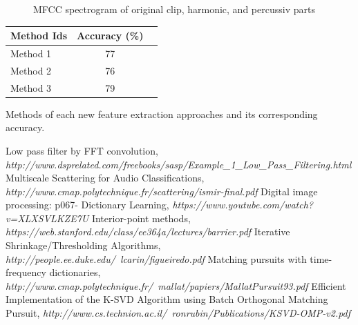 \documentclass[final]{siamltexmm}
\begin{document}
\begin{figure}[!ht]
  \centering
  \caption{MFCC spectrogram of original clip, harmonic, and percussiv parts}
\end{figure}

\begin{center}
  \begin{tabular}{ l || c | r }
    \hline
    Method Ids & Accuracy (\%) \\ \hline \hline
    Method 1 & 77 \\ \hline
    Method 2 & 76 \\ \hline
    Method 3 & 79 \\ \hline
    \hline
  \end{tabular}
  \begin{tablenotes}
    \small
    \item Methods of each new feature extraction approaches and its corresponding accuracy.
  \end{tablenotes}
\end{center}

\begin{thebibliography}{10}
 {\sc Low pass filter by FFT convolution}, {\em http://www.dsprelated.com/freebooks/sasp/Example\_1\_Low\_Pass\_Filtering.html}
 {\sc Multiscale Scattering for Audio Classifications}, {\em http://www.cmap.polytechnique.fr/scattering/ismir-final.pdf}
 {\sc Digital image processing: p067- Dictionary Learning}, {\em https://www.youtube.com/watch?v=XLXSVLKZE7U}
 {\sc Interior-point methods}, {\em https://web.stanford.edu/class/ee364a/lectures/barrier.pdf}
 {\sc Iterative Shrinkage/Thresholding Algorithms}, {\em http://people.ee.duke.edu/~lcarin/figueiredo.pdf}
 {\sc Matching pursuits with time-frequency dictionaries}, {\em http://www.cmap.polytechnique.fr/~mallat/papiers/MallatPursuit93.pdf}
 {\sc Efficient Implementation of the K-SVD Algorithm using Batch Orthogonal Matching Pursuit}, {\em http://www.cs.technion.ac.il/~ronrubin/Publications/KSVD-OMP-v2.pdf}
\end{thebibliography}
\end{document}

